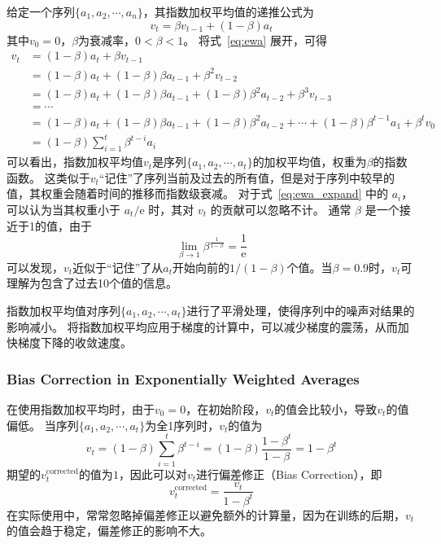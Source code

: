 给定一个序列$\{a_1, a_2, \cdots, a_n\}$，其指数加权平均值的递推公式为
\begin{equation}
    v_t = \beta v_{t-1} + (1 - \beta)a_t
    \label{eq:ewa}
\end{equation}
其中$v_0 = 0$，$\beta$为衰减率，$0 < \beta < 1$。
将式~\eqref{eq:ewa} 展开，可得
\begin{equation}
    \begin{aligned}
        v_t &= (1 - \beta)a_t + \beta v_{t-1} \\
            &= (1 - \beta)a_t + (1 - \beta)\beta a_{t-1} + \beta^2 v_{t-2} \\
            &= (1 - \beta)a_t + (1 - \beta)\beta a_{t-1} + (1 - \beta)\beta^2 a_{t-2} + \beta^3 v_{t-3} \\
            &= \cdots \\
            &= (1 - \beta)a_t + (1 - \beta)\beta a_{t-1} + (1 - \beta)\beta^2 a_{t-2} + \cdots + (1 - \beta)\beta^{t-1}a_1 + \beta^t v_0 \\
            &= (1 - \beta)\sum_{i=1}^t\beta^{t-i}a_i
    \end{aligned}
    \label{eq:ewa_expand}
\end{equation}
可以看出，指数加权平均值$v_t$是序列$\{a_1, a_2, \cdots, a_t\}$的加权平均值，权重为$\beta$的指数函数。
这类似于$v_t$“记住”了序列当前及过去的所有值，但是对于序列中较早的值，其权重会随着时间的推移而指数级衰减。
对于式~\eqref{eq:ewa_expand} 中的 $a_i$，可以认为当其权重小于 $a_t/\mathrm{e}$ 时，其对 $v_t$ 的贡献可以忽略不计。
通常 $\beta$ 是一个接近于1的值，由于
\begin{equation}
    \lim_{\beta \to 1}  \beta^{\frac{\scriptstyle 1}{\scriptstyle 1-\beta}} = \frac{1}{\mathrm{e}}
\end{equation}
可以发现，$v_t$近似于“记住”了从$a_t$开始向前的$1/(1-\beta)$个值。当$\beta=0.9$时，$v_t$可理解为包含了过去10个值的信息。

指数加权平均值对序列$\{a_1, a_2, \cdots, a_t\}$进行了平滑处理，使得序列中的噪声对结果的影响减小。
将指数加权平均应用于梯度的计算中，可以减少梯度的震荡，从而加快梯度下降的收敛速度。

\subsubsection{Bias Correction in Exponentially Weighted Averages}

在使用指数加权平均时，由于$v_0 = 0$，在初始阶段，$v_t$的值会比较小，导致$v_t$的值偏低。
当序列$\{a_1, a_2, \cdots, a_t\}$为全1序列时，$v_t$的值为
\begin{equation}
    v_t = (1 - \beta)\sum_{i=1}^t\beta^{t-i} = (1 - \beta)\frac{1 - \beta^t}{1 - \beta} = 1 - \beta^t
\end{equation}
期望的$v_t^{\mathrm{corrected}}$的值为$1$，因此可以对$v_t$进行偏差修正（Bias Correction），即
\begin{equation}
    v_t^{\mathrm{corrected}} = \frac{v_t}{1 - \beta^t}
\end{equation}
在实际使用中，常常忽略掉偏差修正以避免额外的计算量，因为在训练的后期，$v_t$的值会趋于稳定，偏差修正的影响不大。

